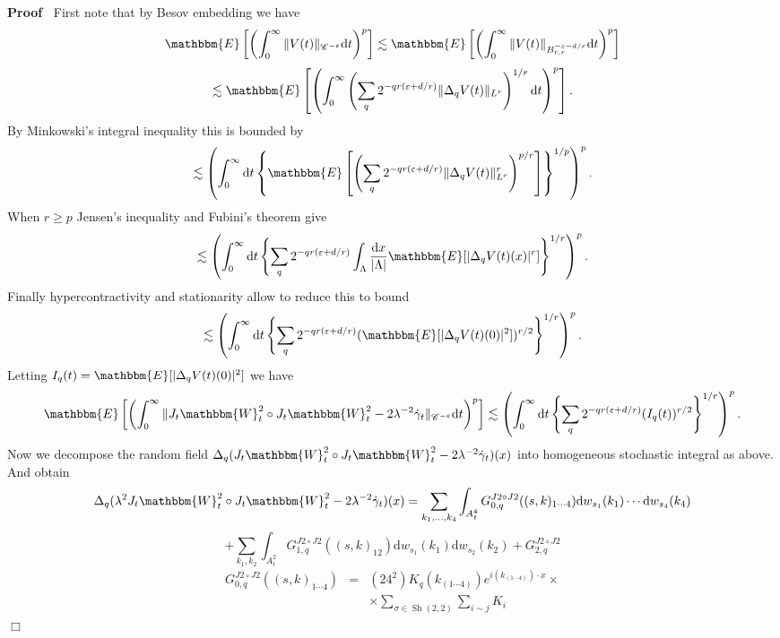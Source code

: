 \documentclass[11pt, oneside]{article}   	%
\newcommand{\mathd}{\mathrm{d}}
\newcommand{\tmop}[1]{\ensuremath{\operatorname{#1}}}
\newenvironment{proof}{\noindent\textbf{Proof\ }}{\hspace*{\fill}$\Box$\medskip}
\newcommand{\VV}{\mathscr{C}}
\begin{document}
\begin{proof}
  First note that by Besov embedding we have
  \[ \mathbbm{E} \left[ \left( \int^{\infty}_0 \| V (t) \|_{\VV^{-
     \varepsilon}} \mathd t \right)^p \right] \lesssim \mathbbm{E} \left[
     \left( \int^{\infty}_0 \| V (t) \|_{B^{- \varepsilon - d / r}_{r, r}}
     \mathd t \right)^p \right] \]
  \[ \lesssim \mathbbm{E} \left[ \left( \int^{\infty}_0 \left( \sum_q 2^{- q r
     (\varepsilon + d / r)} \| \Delta_q V (t) \|_{L^r} \right)^{1 / r} \mathd
     t \right)^p \right] . \]
  By Minkowski's integral inequality this is bounded by
  \[ \lesssim \left( \int^{\infty}_0 \mathd t \left\{ \mathbbm{E} \left[
     \left( \sum_q 2^{- q r (\varepsilon + d / r)} \| \Delta_q V (t)
     \|_{L^r}^r \right)^{p / r} \right] \right\}^{1 / p} \right)^p . \]
  When $r \geqslant p$ Jensen's inequality and Fubini's theorem give
  \[ \lesssim \left( \int^{\infty}_0 \mathd t \left\{ \sum_q 2^{- q r
     (\varepsilon + d / r)} \int_{\Lambda} \frac{\mathd x}{| \Lambda |}
     \mathbbm{E} [| \Delta_q V (t) (x) |^r] \right\}^{1 / r} \right)^p . \]
  Finally hypercontractivity and stationarity allow to reduce this to bound
  \[ \lesssim \left( \int^{\infty}_0 \mathd t \left\{ \sum_q 2^{- q r
     (\varepsilon + d / r)}  (\mathbbm{E} [| \Delta_q V (t) (0) |^2])^{r /
     2} \right\}^{1 / r} \right)^p . \]
  Letting $I_q (t) =\mathbbm{E} [| \Delta_q V (t) (0) |^2]$ we have
  \[ \mathbbm{E} \left[ \left( \int^{\infty}_0 \| J_t \mathbbm{W}^2_t \circ
     J_t \mathbbm{W}^2_t - 2 \lambda^{- 2} \dot{\gamma}_t \|_{\VV^{-
     \varepsilon}} \mathd t \right)^p \right] \lesssim \left( \int^{\infty}_0
     \mathd t \left\{ \sum_q 2^{- q r (\varepsilon + d / r)}  (I_q (t))^{r /
     2} \right\}^{1 / r} \right)^p . \]
  Now we decompose the random field $\Delta_q (J_t \mathbbm{W}^2_t \circ J_t
  \mathbbm{W}^2_t - 2 \lambda^{- 2} \dot{\gamma}_t) (x)$ into homogeneous
  stochastic integral as above. And obtain
  \[ \Delta_q (\lambda^2 J_t \mathbbm{W}^2_t \circ J_t \mathbbm{W}^2_t - 2
     \lambda^{- 2} \dot{\gamma}_t) (x) = \sum_{k_1, \ldots, k_4} \int_{A_t^4}
     G^{J 2 \circ J 2}_{0, q} ((s, k)_{1 \cdots 4}) \mathd w_{s_1} (k_1)
     \cdots \mathd w_{s_4} (k_4) \]
  \[ + \sum_{k_1, k_2} \int_{A_t^2} G^{J 2 \circ J 2}_{1, q} ((s, k)_{1 2})
     \mathd w_{s_1} (k_1) \mathd w_{s_2} (k_2) + G^{J 2 \circ J 2}_{2, q} \]
  \begin{eqnarray}
    G^{J 2 \circ J 2}_{0, q} ((s, k)_{1 \cdots 4}) & = & (24^2) K_q (k_{(1
    \cdots 4)}) e^{i (k_{(1 \cdots 4)}) \cdot x} \times \nonumber\\
    &  & \times \sum_{\sigma \in \tmop{Sh} (2, 2)} \sum_{i \sim j} K_i

\end{eqnarray}
\end{proof}
\end{document}
